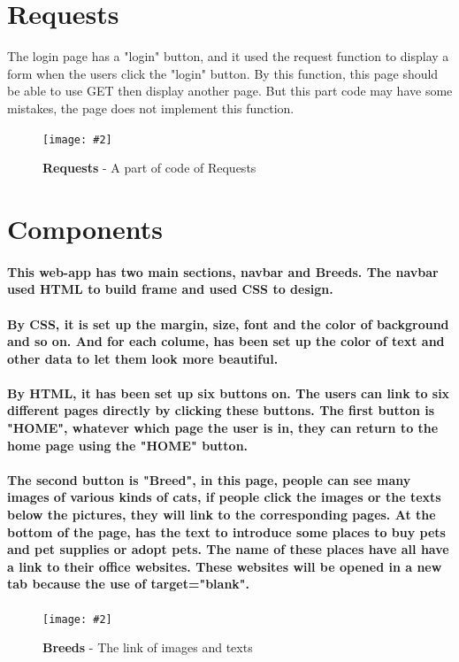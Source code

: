 \documentclass[10pt, a4paper]{article}
\newcommand{\figuremacro}[5]{
    \begin{figure}[#1]
        \centering
        \texttt{[image: \#2]}
        \caption[#3]{\textbf{#3}#4}
        \label{fig:#2}
    \end{figure}
}
\begin{document}
    \section{Requests}
    The login page has a "login" button, and it used the request function to display a form when the users click the "login" button. By this function, this page should be able to use GET then display another page. But this part code may have some mistakes, the page does not implement this function.
    
    \figuremacro{h}{log1.JPG}{Requests}{ - A part of code of Requests}{1.0}
    
    \section{Components}
    \paragraph{This web-app has two main sections, navbar and Breeds. The navbar used HTML to build frame and used CSS to design. }
    \paragraph{By CSS, it is set up the margin, size, font and the color of background and so on. And for each colume, has been set up the color of text and other data to let them look more beautiful.}
    \paragraph{By HTML, it has been set up six buttons on. The users can link to six different pages directly by clicking these buttons. The first button is "HOME", whatever which page the user is in, they can return to the home page using the "HOME" button.}
    \paragraph{The second button is "Breed", in this page, people can see many images of various kinds of cats, if people click the images or the texts below the pictures, they will link to the corresponding pages. At the bottom of the page, has the text to introduce some places to buy pets and pet supplies or adopt pets. The name of these places have all have a link to their office websites. These websites will be opened in a new tab because the use of target="blank".}
     \figuremacro{h}{rbs.JPG}{Breeds}{ - The link of images and texts}{1.0}
\end{document}
